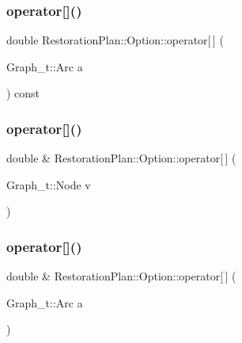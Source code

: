 \subsubsection{\texorpdfstring{operator[]()}{operator[]()}\hspace{0.1cm}{\footnotesize\ttfamily [2/4]}}
{\footnotesize\ttfamily double Restoration\+Plan\+::\+Option\+::operator\mbox{[}$\,$\mbox{]} (\begin{DoxyParamCaption}\item[{Graph\+\_\+t\+::\+Arc}]{a }\end{DoxyParamCaption}) const}

\mbox{\label{class_restoration_plan_1_1_option_a6b8531ca7119295af00743a0f4797dba}} 
\subsubsection{\texorpdfstring{operator[]()}{operator[]()}\hspace{0.1cm}{\footnotesize\ttfamily [3/4]}}
{\footnotesize\ttfamily double \& Restoration\+Plan\+::\+Option\+::operator\mbox{[}$\,$\mbox{]} (\begin{DoxyParamCaption}\item[{Graph\+\_\+t\+::\+Node}]{v }\end{DoxyParamCaption})}

\mbox{\label{class_restoration_plan_1_1_option_a9b78dc0b8b13778ce128f6b723aabdda}} 
\subsubsection{\texorpdfstring{operator[]()}{operator[]()}\hspace{0.1cm}{\footnotesize\ttfamily [4/4]}}
{\footnotesize\ttfamily double \& Restoration\+Plan\+::\+Option\+::operator\mbox{[}$\,$\mbox{]} (\begin{DoxyParamCaption}\item[{Graph\+\_\+t\+::\+Arc}]{a }\end{DoxyParamCaption})}

